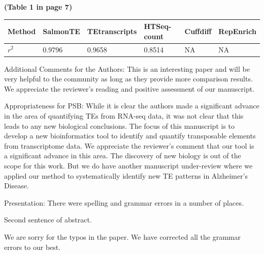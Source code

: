 \documentclass[10pt]{article}
\begin{document}
\begin{response}
\textbf{(Table 1 in page 7)}
\begin{table}[h]
\begin{center}
\begin{tabular}{l|lllll}
	\hline
	Method    & SalmonTE & TEtranscripts & HTSeq-count & Cuffdiff & RepEnrich  \\ \hline
	 $r^2$ & 0.9796 & 0.9658 & 0.8514 & NA & NA \\ \hline
\end{tabular}
\end{center}
\end{table}


\end{response}

\begin{response}{Additional Comments for the Authors: This is an interesting paper and will be very helpful to the community as long as they provide more comparison results.}
We appreciate the reviewer's reading and positive assessment of our manuscript.
\end{response}


\begin{response}{Appropriateness for PSB: While it is clear the authors made a significant advance in the area of quantifying TEs from RNA-seq data, it was not clear that this leads to any new biological conclusions.}
The focus of this manuscript is to develop a new bioinformatics tool to identify and quantify transposable elements from 
transcriptome data.  We appreciate the reviewer's comment that our tool is a significant advance in this area.  The discovery of new biology is out of the scope for this work. But we do have another manuscript under-review where we applied our method to systematically identify new TE patterns in Alzheimer's Disease.
\end{response}


\begin{response}{Presentation: There were spelling and grammar errors in a number of places.

Second sentence of abstract. 
}

We are sorry for the typos in the paper.  We have corrected all the grammar errors to our best. 
\end{response}
\end{document}
